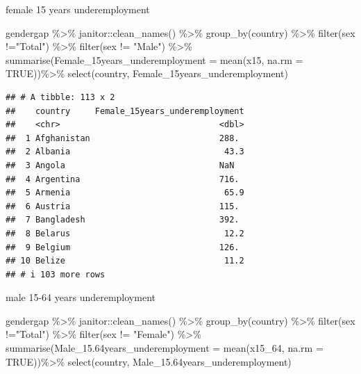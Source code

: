 \documentclass[
]{article}
\newenvironment{Shaded}{\begin{snugshade}}{\end{snugshade}}
\newcommand{\AttributeTok}[1]{\textcolor[rgb]{0.77,0.63,0.00}{#1}}
\newcommand{\ConstantTok}[1]{\textcolor[rgb]{0.00,0.00,0.00}{#1}}
\newcommand{\FloatTok}[1]{\textcolor[rgb]{0.00,0.00,0.81}{#1}}
\newcommand{\FunctionTok}[1]{\textcolor[rgb]{0.00,0.00,0.00}{#1}}
\newcommand{\NormalTok}[1]{#1}
\newcommand{\SpecialCharTok}[1]{\textcolor[rgb]{0.00,0.00,0.00}{#1}}
\newcommand{\StringTok}[1]{\textcolor[rgb]{0.31,0.60,0.02}{#1}}
\begin{document}
female 15 years underemployment

\begin{Shaded}
\begin{Highlighting}[]
\NormalTok{gendergap }\SpecialCharTok{\%\textgreater{}\%}
\NormalTok{  janitor}\SpecialCharTok{::}\FunctionTok{clean\_names}\NormalTok{() }\SpecialCharTok{\%\textgreater{}\%}
  \FunctionTok{group\_by}\NormalTok{(country) }\SpecialCharTok{\%\textgreater{}\%}
  \FunctionTok{filter}\NormalTok{(sex }\SpecialCharTok{!=}\StringTok{"Total"}\NormalTok{) }\SpecialCharTok{\%\textgreater{}\%}
  \FunctionTok{filter}\NormalTok{(sex }\SpecialCharTok{!=} \StringTok{"Male"}\NormalTok{) }\SpecialCharTok{\%\textgreater{}\%}
  \FunctionTok{summarise}\NormalTok{(}\AttributeTok{Female\_15years\_underemployment =} \FunctionTok{mean}\NormalTok{(x15, }\AttributeTok{na.rm =} \ConstantTok{TRUE}\NormalTok{))}\SpecialCharTok{\%\textgreater{}\%}
  \FunctionTok{select}\NormalTok{(country, Female\_15years\_underemployment)}
\end{Highlighting}
\end{Shaded}

\begin{verbatim}
## # A tibble: 113 x 2
##    country     Female_15years_underemployment
##    <chr>                                <dbl>
##  1 Afghanistan                          288. 
##  2 Albania                               43.3
##  3 Angola                               NaN  
##  4 Argentina                            716. 
##  5 Armenia                               65.9
##  6 Austria                              115. 
##  7 Bangladesh                           392. 
##  8 Belarus                               12.2
##  9 Belgium                              126. 
## 10 Belize                                11.2
## # i 103 more rows
\end{verbatim}

male 15-64 years underemployment

\begin{Shaded}
\begin{Highlighting}[]
\NormalTok{gendergap }\SpecialCharTok{\%\textgreater{}\%}
\NormalTok{  janitor}\SpecialCharTok{::}\FunctionTok{clean\_names}\NormalTok{() }\SpecialCharTok{\%\textgreater{}\%}
  \FunctionTok{group\_by}\NormalTok{(country) }\SpecialCharTok{\%\textgreater{}\%}
  \FunctionTok{filter}\NormalTok{(sex }\SpecialCharTok{!=}\StringTok{"Total"}\NormalTok{) }\SpecialCharTok{\%\textgreater{}\%}
  \FunctionTok{filter}\NormalTok{(sex }\SpecialCharTok{!=} \StringTok{"Female"}\NormalTok{) }\SpecialCharTok{\%\textgreater{}\%}
  \FunctionTok{summarise}\NormalTok{(}\AttributeTok{Male\_15.64years\_underemployment =} \FunctionTok{mean}\NormalTok{(x15\_64, }\AttributeTok{na.rm =} \ConstantTok{TRUE}\NormalTok{))}\SpecialCharTok{\%\textgreater{}\%}
  \FunctionTok{select}\NormalTok{(country, Male\_15}\FloatTok{.64}\NormalTok{years\_underemployment)}
\end{Highlighting}
\end{Shaded}
\end{document}
